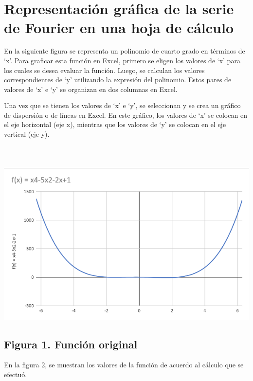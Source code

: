 
\section{\texorpdfstring{Representación gráfica de la serie de Fourier en una hoja de cálculo }{Representación gráfica de la serie de Fourier en una hoja de cálculo }}\label{representaciuxf3n-gruxe1fica-de-la-serie-de-fourier-en-una-hoja-de-cuxe1lculo}

En la siguiente figura se representa un polinomio de cuarto grado en términos de `x'. Para graficar esta función en Excel, primero se eligen los valores de `x' para los cuales se desea evaluar la función. Luego, se calculan los valores correspondientes de `y' utilizando la expresión del polinomio. Estos pares de valores de `x' e `y' se organizan en dos columnas en Excel.

Una vez que se tienen los valores de `x' e `y', se seleccionan y se crea un gráfico de dispersión o de líneas en Excel. En este gráfico, los valores de `x' se colocan en el eje horizontal (eje x), mientras que los valores de `y' se colocan en el eje vertical (eje y).

\subsection[Figura 1. Función original]{\texorpdfstring{\protect\includegraphics[width=6.26772in,height=3.875in]{media/image32.png}Figura 1. Función original}{Figura 1. Función original}}\label{figura-1.-funciuxf3n-original}

En la figura 2, se muestran los valores de la función de acuerdo al cálculo que se efectuó.

